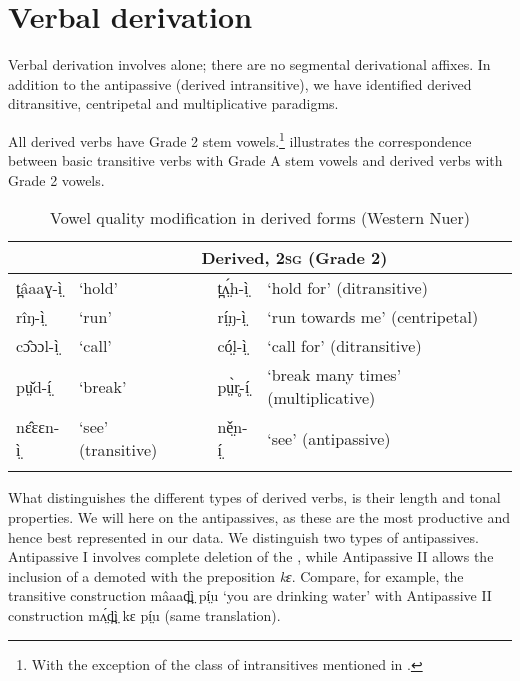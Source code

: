 \documentclass[output=paper,newtxmath,modfonts,nonflat,draftmode]{langsci/langscibook}
\begin{document}
\section{Verbal derivation} %

Verbal derivation involves  alone; there are no segmental derivational affixes. In addition to the antipassive (derived intransitive), we have identified derived ditransitive, centripetal and multiplicative paradigms.

All derived verbs have Grade 2 stem vowels.\footnote{With\label{fn:monich:9} the exception of the class of intransitives mentioned in  .}  illustrates the correspondence between basic transitive verbs with Grade A stem vowels and derived verbs with Grade 2 vowels.


\begin{table}
\begin{tabularx}{\textwidth}{lllXll}
\lsptoprule
\multicolumn{2}{l}{\bfseries Basic, 2\textsc{sg} (Grade 1)} & & \multicolumn{3}{l}{\bfseries Derived, 2\textsc{sg} (Grade 2)}\\
\midrule
t̪âaaɣ-ì̤ & ‘hold’& & t̪ʌ̤́h-ì̤ & ‘hold for’ (ditransitive)\\
rîŋ-ì̤ & ‘run’ && rí̤ŋ-ì̤ & ‘run towards me’ (centripetal)\\
cɔ̂ɔɔl-ì̤ & ‘call’ && có̤l-ì̤ & ‘call for’ (ditransitive)\\
pṳ̌d-í̤ & ‘break’& & pṳ̀r̥-í̤  & ‘break many times’ (multiplicative)\\
nɛ̂ɛɛn-ì̤ & ‘see’ (transitive) && ně̤n-í̤ & ‘see’ (antipassive)\\
\lspbottomrule    
\end{tabularx}
\caption{Vowel quality modification in derived forms (Western Nuer)}
\label{tab:monich:12}
\end{table}

What distinguishes the different types of derived verbs, is their length and tonal properties. We will  here on the antipassives, as these are the most productive and hence best represented in our data. We distinguish two types of antipassives. Antipassive I involves complete deletion of the , while Antipassive II allows the inclusion of a demoted  with the preposition \textit{kɛ}. Compare, for example, the transitive construction mâaad̪ì̤ pí̤u ‘you are drinking water’ with Antipassive II construction mʌ̤́d̪ì̤ kɛ pí̤u (same translation).
\end{document}

